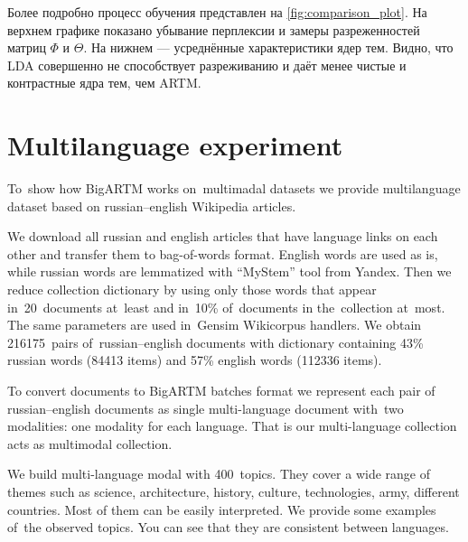 \documentclass{article}
\begin{document}
Более подробно процесс обучения представлен на \ref{fig:comparison_plot}. На верхнем графике показано убывание перплексии и замеры разреженностей матриц $\Phi$ и $\Theta$. На нижнем --- усреднённые характеристики ядер тем. Видно, что LDA совершенно не способствует разреживанию и даёт менее чистые и контрастные ядра тем, чем ARTM.


\section{Multilanguage experiment}

To~show how BigARTM works on~multimadal datasets we provide multilanguage dataset 
based on russian--english Wikipedia articles. 

We download all russian and english articles that have language links on each other
and transfer them to bag-of-words format. 
English words are used as is, while russian words are lemmatized with ``MyStem'' tool from Yandex.
Then we reduce collection dictionary by using only those words 
that appear in~20~documents at~least and in~10\% of~documents in the~collection at~most. 
The same parameters are used in~Gensim Wikicorpus handlers.
We obtain 216175~pairs of~russian--english documents with dictionary 
containing 43\% russian words (84413 items) and 57\% english words (112336 items).

To convert documents to BigARTM batches format we represent each pair of russian--english documents 
as single multi-language document with~two modalities: one modality for each language.  
That is our multi-language collection acts as multimodal collection. 

We build multi-language modal with 400~topics. They cover a wide range of themes such as science, architecture, history, culture, technologies, army, different countries.
Most of them can be easily interpreted.
We provide some examples of~the observed topics. 
You can see that they are consistent between languages.
\end{document}
